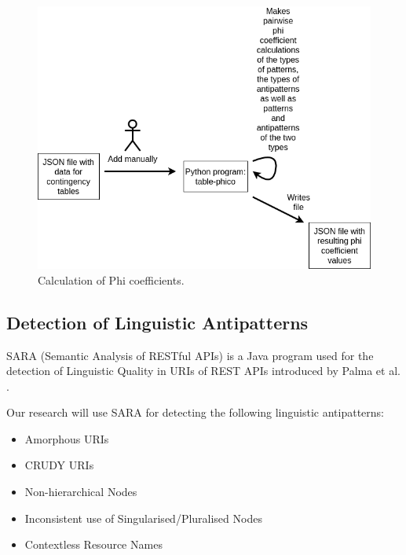 \begin{figure}[h!]
 \centering
 \includegraphics[scale=0.5]{img/method_figures/table_phico.png}
 \caption{Calculation of Phi coefficients.}
 \label{fig:Calculationofphicoefficients}
\end{figure}

\clearpage

\subsection{Detection of Linguistic Antipatterns}

SARA (Semantic Analysis of RESTful APIs) is a Java program used for the detection of Linguistic Quality in URIs of REST APIs introduced by Palma et al. \cite{linguistic}. 

Our research will use SARA \cite{linguistic} for detecting the following linguistic antipatterns:
\begin{itemize}
\item Amorphous URIs
\item CRUDY URIs
\item Non-hierarchical Nodes
\item Inconsistent use of Singularised/Pluralised Nodes
\item Contextless Resource Names
\end{itemize}


